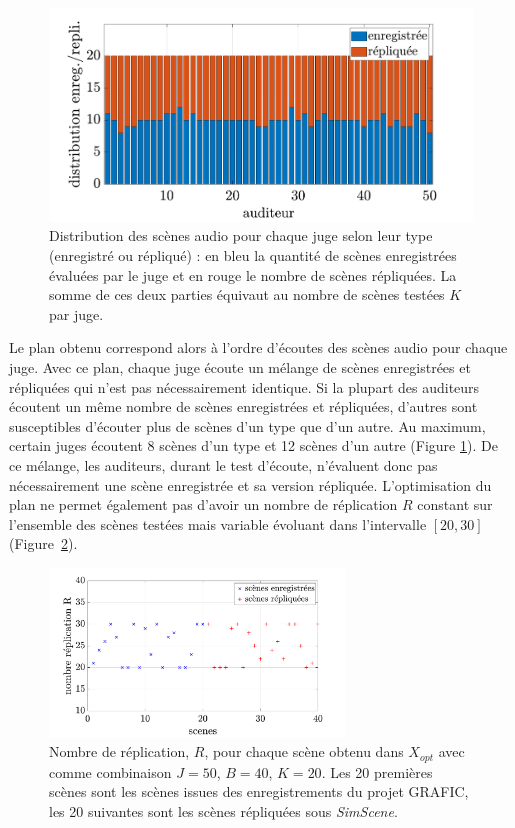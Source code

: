 {\begin{figure}[h]
\centering
\includegraphics[width=.7\linewidth]{./figures/test_perceptif/repartition-real-simulated.pdf}
\caption{Distribution des scènes audio pour chaque juge selon leur type (enregistré ou répliqué) : en bleu la quantité de scènes enregistrées évaluées par le juge et en rouge le nombre de scènes répliquées. La somme de ces deux parties équivaut au nombre de scènes testées $K$ par juge.}
\label{fig:repartitionScene}
\end{figure}

Le plan obtenu correspond alors à l'ordre d'écoutes des scènes audio pour chaque juge. Avec ce plan, chaque juge écoute un mélange de scènes enregistrées et répliquées qui n'est pas nécessairement identique. Si la plupart des auditeurs écoutent un même nombre de scènes enregistrées et répliquées, d'autres sont susceptibles d'écouter plus de scènes d'un type que d'un autre. Au maximum, certain juges écoutent 8 scènes d'un type et 12 scènes d'un autre (Figure \ref{fig:repartitionScene}). 
De ce mélange, les auditeurs, durant le test d'écoute, n'évaluent donc pas nécessairement une scène enregistrée et sa version répliquée. 
L'optimisation du plan ne permet également pas d'avoir un nombre de réplication $R$ constant sur l'ensemble des scènes testées mais variable évoluant dans l'intervalle $\left[20,30 \right]$ (Figure~\ref{fig:replication}). \\


\begin{figure}[ht]
\centering
\includegraphics[width = 0.7\textwidth]{./figures/test_perceptif/nb_replication.pdf}
\caption{Nombre de réplication, $R$, pour chaque scène obtenu dans $X_{opt}$ avec comme combinaison $J = 50$, $B = 40$, $K = 20$. Les 20 premières scènes sont les scènes issues des enregistrements du projet GRAFIC, les 20 suivantes sont les scènes répliquées sous \textit{SimScene}.}
\label{fig:replication}
\end{figure}

}
